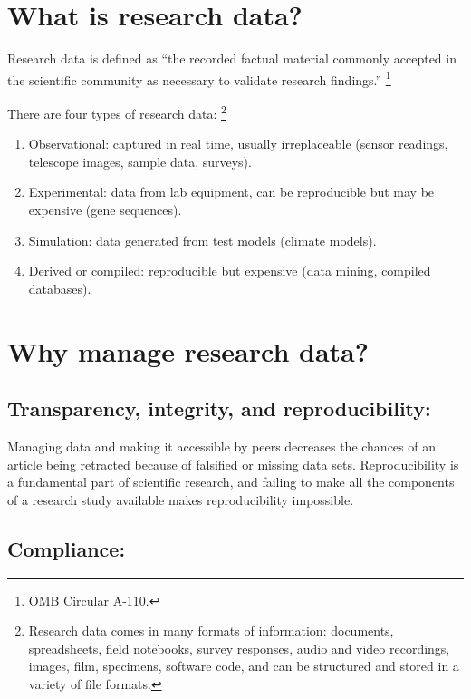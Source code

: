 \documentclass{tufte-handout}
\begin{document}
\section{What is research data?}\label{what-is-research-data}

Research data is defined as ``the recorded factual material commonly
accepted in the scientific community as necessary to validate research
findings.'' \footnote {OMB Circular A-110.}

There are four types of research data: \footnote {Research data comes in many formats of information: documents,
spreadsheets, field notebooks, survey responses, audio and video
recordings, images, film, specimens, software code, and can be
structured and stored in a variety of file formats.}

\begin{enumerate}
\def\labelenumi{\arabic{enumi}.}
\itemsep1pt\parskip0pt
\item
  Observational: captured in real time, usually irreplaceable (sensor readings, telescope images, sample data, surveys).
\item
  Experimental: data from lab equipment, can be reproducible but may be expensive (gene sequences).
\item
  Simulation: data generated from test models (climate models).
\item
  Derived or compiled: reproducible but expensive (data mining, compiled databases).
\end{enumerate}


\section{Why manage research data?}\label{why-manage-research-data}

\subsection{Transparency, integrity, and reproducibility:}\label{transparency-integrity-and-reproducibility}

Managing data and making it accessible by peers decreases the chances of an article being retracted because of falsified or missing data sets.
Reproducibility is a fundamental part of scientific research, and failing to make all the components of a research study available makes reproducibility impossible.

\subsection{Compliance:}\label{compliance}
\end{document}
